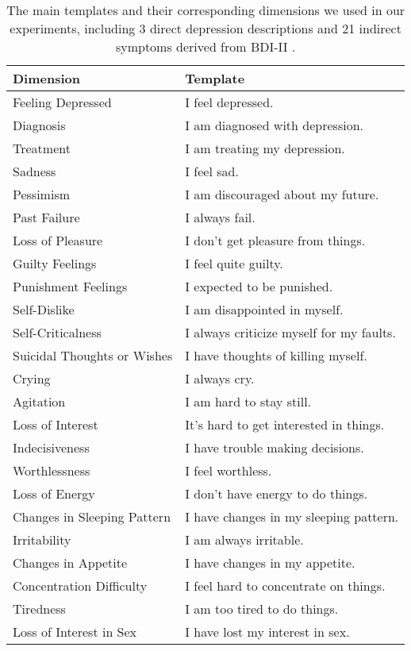 \documentclass[letterpaper]{article} %
\begin{document}
\begin{table*}[htbp]
  \centering
  \begin{tabular}{l|l}
  \hline
  Dimension & Template \\
  \hline
  Feeling Depressed  &  I feel depressed. \\
  Diagnosis &  I am diagnosed with depression. \\
  Treatment &  I am treating my depression. \\
  \hline
  Sadness & I feel sad.  \\
  Pessimism & I am discouraged about my future.  \\
  Past Failure & I always fail. \\
  Loss of Pleasure & I don't get pleasure from things. \\
  Guilty Feelings & I feel quite guilty. \\
  Punishment Feelings & I expected to be punished. \\
  Self-Dislike & I am disappointed in myself. \\
  Self-Criticalness & I always criticize myself for my faults. \\
  Suicidal Thoughts or Wishes & I have thoughts of killing myself. \\
  Crying & I always cry. \\
  Agitation & I am hard to stay still. \\
  Loss of Interest & It's hard to get interested in things. \\
  Indecisiveness & I have trouble making decisions. \\
  Worthlessness & I feel worthless. \\
  Loss of Energy & I don't have energy to do things. \\
  Changes in Sleeping Pattern & I have changes in my sleeping pattern. \\
  Irritability & I am always irritable. \\
  Changes in Appetite & I have changes in my appetite. \\
  Concentration Difficulty & I feel hard to concentrate on things. \\
  Tiredness  & I am too tired to do things. \\
  Loss of Interest in Sex & I have lost my interest in sex. \\
  \hline
  \end{tabular}
  \caption{\label{tab:BDI-II} The main templates and their corresponding dimensions we used in our experiments, including 3 direct depression descriptions and 21 indirect symptoms derived from BDI-II \citep{beck1996beck}. }
\end{table*}
\end{document}
